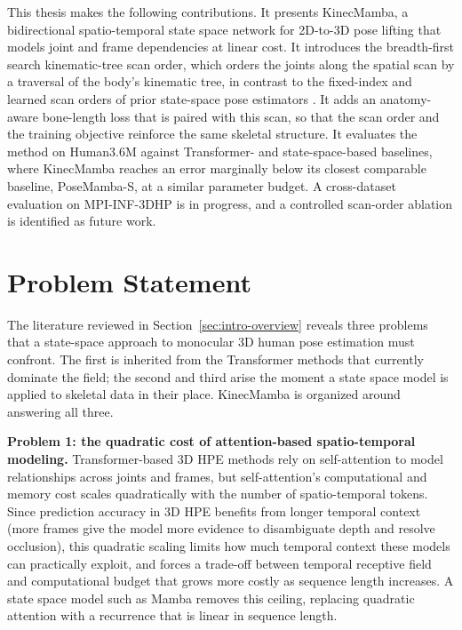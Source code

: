 This thesis makes the following contributions. It presents KinecMamba, a
bidirectional spatio-temporal state space network for 2D-to-3D pose lifting
that models joint and frame dependencies at linear cost. It introduces the
breadth-first search kinematic-tree scan order, which orders the joints along
the spatial scan by a traversal of the body's kinematic tree, in contrast to
the fixed-index and learned scan orders of prior state-space pose estimators
\cite{nguyen2025skeletonmamba}. It adds an anatomy-aware bone-length loss that
is paired with this scan, so that the scan order and the training objective
reinforce the same skeletal structure. It evaluates the method on Human3.6M
against Transformer- and state-space-based baselines, where KinecMamba
reaches an error marginally below its closest comparable baseline,
PoseMamba-S, at a similar parameter budget. A cross-dataset evaluation on
MPI-INF-3DHP is in progress, and a controlled scan-order ablation is
identified as future work.

\section{Problem Statement}
\label{sec:intro-problem-statement}

The literature reviewed in Section~\ref{sec:intro-overview} reveals three
problems that a state-space approach to monocular 3D human pose estimation
must confront. The first is inherited from the Transformer methods that
currently dominate the field; the second and third arise the moment a state
space model is applied to skeletal data in their place. KinecMamba is
organized around answering all three.

\textbf{Problem 1: the quadratic cost of attention-based spatio-temporal
modeling.} Transformer-based 3D HPE methods \cite{zheng2021poseformer,
li2022mhformer, zhang2022mixste, zhao2023poseformerv2, tang2023stcformer,
zhu2023motionbert, mehraban2024motionagformer} rely on self-attention to
model relationships across joints and frames, but self-attention's
computational and memory cost scales quadratically with the number of
spatio-temporal tokens. Since prediction accuracy in 3D HPE benefits from
longer temporal context (more frames give the model more evidence to
disambiguate depth and resolve occlusion), this quadratic scaling limits how
much temporal context these models can practically exploit, and forces a
trade-off between temporal receptive field and computational budget that
grows more costly as sequence length increases. A state space model such as
Mamba \cite{gu2023mamba} removes this ceiling, replacing quadratic attention
with a recurrence that is linear in sequence length.

